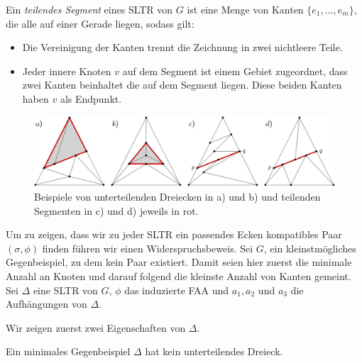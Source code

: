 \begin{definition}
Ein \textit{teilendes Segment} eines SLTR von $G$ ist eine Menge von Kanten $\{e_1, \ldots , e_m\}$, die alle auf einer Gerade liegen, sodass gilt:
\begin{itemize}
\item Die Vereinigung der Kanten trennt die Zeichnung in zwei nichtleere Teile. 
\item Jeder innere Knoten $v$ auf dem Segment ist einem Gebiet zugeordnet, dass zwei Kanten beinhaltet die auf dem Segment liegen. Diese beiden Kanten haben $v$ als Endpunkt.
\end{itemize}
\end{definition}

\begin{figure}[h]
	\centering
	  \includegraphics[width=1\textwidth]{subdividing_ex.png}
    	\caption{Beispiele von unterteilenden Dreiecken in a) und b) und teilenden Segmenten in c) und d) jeweils in rot.}
    	\label{subdividing_ex}
\end{figure}

Um zu zeigen, dass wir zu jeder SLTR ein passendes Ecken kompatibles Paar $(\sigma,\phi)$ finden führen wir einen Widerspruchsbeweis. Sei $G$, ein kleinstmögliches Gegenbeispiel, zu dem kein Paar existiert. Damit seien hier zuerst die minimale Anzahl an Knoten und darauf folgend die kleinste Anzahl von Kanten gemeint. Sei $\Delta$ eine SLTR von $G$, $\phi$ das induzierte FAA und $a_1,a_2$ und $a_3$ die Aufhängungen von $\Delta$.

Wir zeigen zuerst zwei Eigenschaften von $\Delta$.

\begin{lemma}\label{lem_subtri}
Ein minimales Gegenbeispiel $\Delta$ hat kein unterteilendes Dreieck.
\end{lemma}

